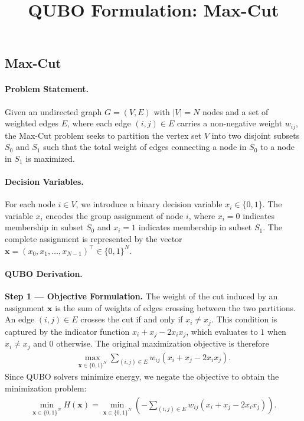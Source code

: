 \documentclass[12pt]{article}
\title{QUBO Formulation: Max-Cut}
\date{}
\begin{document}
\maketitle

\subsection*{Max-Cut}

\paragraph{Problem Statement.}
Given an undirected graph $G = (V, E)$ with $|V| = N$ nodes and a set of weighted edges $E$, where each edge $(i, j) \in E$ carries a non-negative weight $w_{ij}$, the Max-Cut problem seeks to partition the vertex set $V$ into two disjoint subsets $S_0$ and $S_1$ such that the total weight of edges connecting a node in $S_0$ to a node in $S_1$ is maximized.

\paragraph{Decision Variables.}
For each node $i \in V$, we introduce a binary decision variable $x_i \in \{0, 1\}$. The variable $x_i$ encodes the group assignment of node $i$, where $x_i = 0$ indicates membership in subset $S_0$ and $x_i = 1$ indicates membership in subset $S_1$. The complete assignment is represented by the vector $\mathbf{x} = (x_0, x_1, \dots, x_{N-1})^\top \in \{0, 1\}^N$.

\paragraph{QUBO Derivation.}
\textbf{Step 1 --- Objective Formulation.} The weight of the cut induced by an assignment $\mathbf{x}$ is the sum of weights of edges crossing between the two partitions. An edge $(i, j) \in E$ crosses the cut if and only if $x_i \neq x_j$. This condition is captured by the indicator function $x_i + x_j - 2x_i x_j$, which evaluates to $1$ when $x_i \neq x_j$ and $0$ otherwise. The original maximization objective is therefore
\begin{align}
    \max_{\mathbf{x} \in \{0,1\}^N} \sum_{(i,j) \in E} w_{ij} (x_i + x_j - 2x_i x_j).
\end{align}
Since QUBO solvers minimize energy, we negate the objective to obtain the minimization problem:
\begin{align}
    \min_{\mathbf{x} \in \{0,1\}^N} H(\mathbf{x}) = \min_{\mathbf{x} \in \{0,1\}^N} \left( -\sum_{(i,j) \in E} w_{ij} (x_i + x_j - 2x_i x_j) \right).
\end{align}
\end{document}
